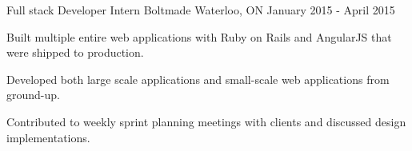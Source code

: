 \begin{cventries}
  \cventry
    {Full stack Developer Intern} %
    {Boltmade} %
    {Waterloo, ON} %
    {January 2015 - April 2015} %
    {
      \begin{cvitems} %
      \item {Built multiple entire web applications with Ruby on Rails and AngularJS that were shipped to production.}
      \item {Developed both large scale applications and small-scale web applications from ground-up.}
      \item {Contributed to weekly sprint planning meetings with clients and discussed design implementations.}
  \end{cvitems} 
    }

\end{cventries}
